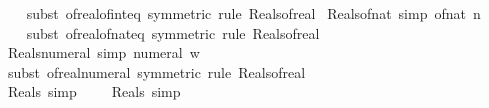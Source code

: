\begin{isabellebody}
%
\isadelimproof
\ \ %
\endisadelimproof
%
\isatagproof
{}\isamarkupfalse%
\ {\isacharparenleft}{\kern0pt}subst\ of{\isacharunderscore}{\kern0pt}real{\isacharunderscore}{\kern0pt}of{\isacharunderscore}{\kern0pt}int{\isacharunderscore}{\kern0pt}eq\ {\isacharbrackleft}{\kern0pt}symmetric{\isacharbrackright}{\kern0pt}{\isacharcomma}{\kern0pt}\ rule\ Reals{\isacharunderscore}{\kern0pt}of{\isacharunderscore}{\kern0pt}real{\isacharparenright}{\kern0pt}%
\endisatagproof
{\isafoldproof}%
%
\isadelimproof
\isanewline
%
\endisadelimproof
\isanewline
{}\isamarkupfalse%
\ Reals{\isacharunderscore}{\kern0pt}of{\isacharunderscore}{\kern0pt}nat\ {\isacharbrackleft}{\kern0pt}simp{\isacharbrackright}{\kern0pt}{\isacharcolon}{\kern0pt}\ {\isachardoublequoteopen}of{\isacharunderscore}{\kern0pt}nat\ n\ {\isasymin}\ {\isasymreal}{\isachardoublequoteclose}\isanewline
%
\isadelimproof
\ \ %
\endisadelimproof
%
\isatagproof
{}\isamarkupfalse%
\ {\isacharparenleft}{\kern0pt}subst\ of{\isacharunderscore}{\kern0pt}real{\isacharunderscore}{\kern0pt}of{\isacharunderscore}{\kern0pt}nat{\isacharunderscore}{\kern0pt}eq\ {\isacharbrackleft}{\kern0pt}symmetric{\isacharbrackright}{\kern0pt}{\isacharcomma}{\kern0pt}\ rule\ Reals{\isacharunderscore}{\kern0pt}of{\isacharunderscore}{\kern0pt}real{\isacharparenright}{\kern0pt}%
\endisatagproof
{\isafoldproof}%
%
\isadelimproof
\isanewline
%
\endisadelimproof
\isanewline
{}\isamarkupfalse%
\ Reals{\isacharunderscore}{\kern0pt}numeral\ {\isacharbrackleft}{\kern0pt}simp{\isacharbrackright}{\kern0pt}{\isacharcolon}{\kern0pt}\ {\isachardoublequoteopen}numeral\ w\ {\isasymin}\ {\isasymreal}{\isachardoublequoteclose}\isanewline
%
\isadelimproof
\ \ %
\endisadelimproof
%
\isatagproof
{}\isamarkupfalse%
\ {\isacharparenleft}{\kern0pt}subst\ of{\isacharunderscore}{\kern0pt}real{\isacharunderscore}{\kern0pt}numeral\ {\isacharbrackleft}{\kern0pt}symmetric{\isacharbrackright}{\kern0pt}{\isacharcomma}{\kern0pt}\ rule\ Reals{\isacharunderscore}{\kern0pt}of{\isacharunderscore}{\kern0pt}real{\isacharparenright}{\kern0pt}%
\endisatagproof
{\isafoldproof}%
%
\isadelimproof
\isanewline
%
\endisadelimproof
\isanewline
{}\isamarkupfalse%
\ Reals{\isacharunderscore}{\kern0pt}{}\ {\isacharbrackleft}{\kern0pt}simp{\isacharbrackright}{\kern0pt}{\isacharcolon}{\kern0pt}\ {\isachardoublequoteopen}{}\ {\isasymin}\ {\isasymreal}{\isachardoublequoteclose}\ \ Reals{\isacharunderscore}{\kern0pt}{}\ {\isacharbrackleft}{\kern0pt}simp{\isacharbrackright}{\kern0pt}{\isacharcolon}{\kern0pt}\ {\isachardoublequoteopen}{}\ {\isasymin}\ {\isasymreal}{\isachardoublequoteclose}\isanewline

\end{isabellebody}
